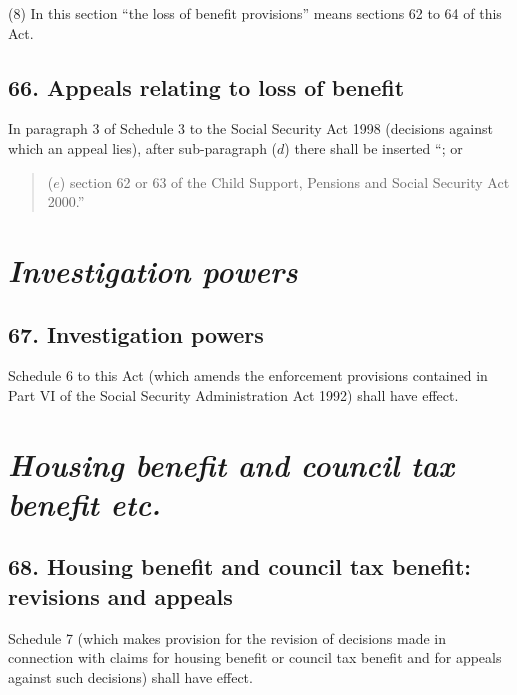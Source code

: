 \documentclass[12pt,a4paper]{article}
\begin{document}
(8) In this section “the loss of benefit provisions” means sections 62 to 64 of this Act.


\subsection{66. Appeals relating to loss of benefit}

In paragraph 3 of Schedule 3 to the Social Security Act 1998 (decisions against which an appeal lies), after sub-paragraph ($d$)  there shall be inserted “; or
\begin{quotation}
($e$) section 62 or 63 of the Child Support, Pensions and Social Security Act 2000.”
\end{quotation}


\section{\itshape Investigation powers}

\subsection{67. Investigation powers}

Schedule 6 to this Act (which amends the enforcement provisions contained in Part VI of the Social Security Administration Act 1992) shall have effect.

\section{\itshape Housing benefit and council tax benefit etc.}

\subsection{68. Housing benefit and council tax benefit: revisions and appeals}

Schedule 7 (which makes provision for the revision of decisions made in connection with claims for housing benefit or council tax benefit and for appeals against such decisions) shall have effect.
\end{document}
